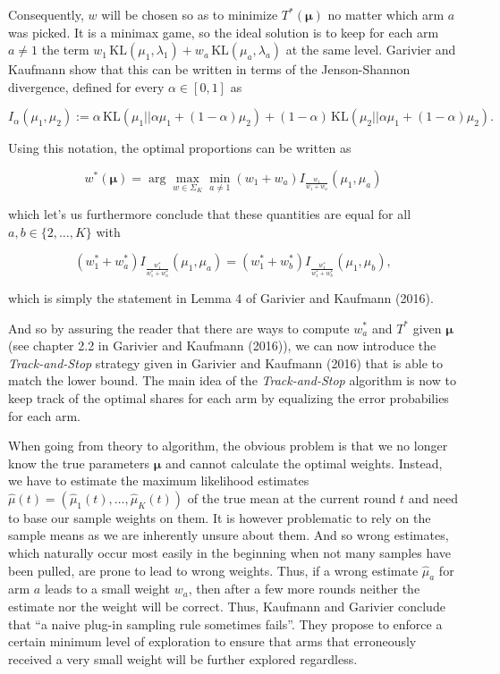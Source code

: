 \documentclass[11pt,]{article}
\newcommand{\KL}{\,\text{KL}}
\begin{document}
Consequently, \(w\) will be chosen so as to minimize \(T^*(\bm{\mu})\)
no matter which arm \(a\) was picked. It is a minimax game, so the ideal
solution is to keep for each arm \(a \neq 1\) the term
\(w_1 \KL(\mu_1, \lambda_1) + w_a \KL(\mu_a, \lambda_a)\) at the same
level. Garivier and Kaufmann show that this can be written in terms of
the Jenson-Shannon divergence, defined for every \(\alpha \in [0,1]\) as

\begin{equation*}
I_{\alpha}(\mu_1, \mu_2) := \alpha \KL(\mu_1 || \alpha \mu_1 + (1-\alpha) \mu_2) + (1-\alpha) \KL(\mu_2 || \alpha \mu_1 + (1-\alpha) \mu_2).
\end{equation*}

Using this notation, the optimal proportions can be written as

\begin{equation*}
w^*(\bm{\mu}) = \arg \max_{w \in \Sigma_K} \min_{a \neq 1} (w_1 + w_a) I_{\frac{w_1}{w_1+w_a}}(\mu_1, \mu_a)
\end{equation*}

which let's us furthermore conclude that these quantities are equal for
all \(a,b \in \{2,\dots, K\}\) with

\begin{equation*}
(w_1^* + w_a^*) I_{\frac{w_1^*}{w_1^*+w_a^*}}(\mu_1, \mu_a) = (w_1^* + w_b^*) I_{\frac{w_1^*}{w_1^*+w_b^*}}(\mu_1, \mu_b),
\end{equation*}

which is simply the statement in Lemma 4 of Garivier and Kaufmann
(2016).

And so by assuring the reader that there are ways to compute \(w_a^*\)
and \(T^*\) given \(\bm{\mu}\) (see chapter 2.2 in Garivier and Kaufmann
(2016)), we can now introduce the \emph{Track-and-Stop} strategy given
in Garivier and Kaufmann (2016) that is able to match the lower bound.
The main idea of the \emph{Track-and-Stop} algorithm is now to keep
track of the optimal shares for each arm by equalizing the error
probabilies for each arm.

When going from theory to algorithm, the obvious problem is that we no
longer know the true parameters \(\bm{\mu}\) and cannot calculate the
optimal weights. Instead, we have to estimate the maximum likelihood
estimates \(\hat{\mu}(t) = (\hat{\mu}_1(t), \dots, \hat{\mu}_K(t))\) of
the true mean at the current round \(t\) and need to base our sample
weights on them. It is however problematic to rely on the sample means
as we are inherently unsure about them. And so wrong estimates, which
naturally occur most easily in the beginning when not many samples have
been pulled, are prone to lead to wrong weights. Thus, if a wrong
estimate \(\hat{\mu}_a\) for arm \(a\) leads to a small weight \(w_a\),
then after a few more rounds neither the estimate nor the weight will be
correct. Thus, Kaufmann and Garivier conclude that ``a naive plug-in
sampling rule sometimes fails''. They propose to enforce a certain
minimum level of exploration to ensure that arms that erroneously
received a very small weight will be further explored regardless.
\end{document}
